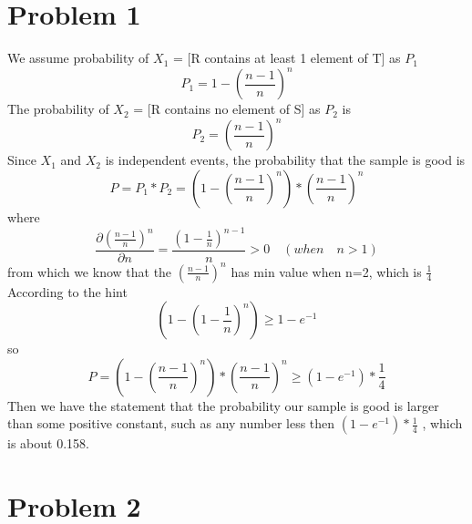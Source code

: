 \documentclass[twoside]{homework}
\begin{document}
\maketitle

\section*{Problem 1}
We assume probability of $X_1$ = [R contains at least 1 element of T] as $P_1$
$$P_1 = 1 - (\frac{n-1}{n})^n$$
The probability of $X_2$ = [R contains no element of S] as $P_2$ is
$$P_2 = (\frac{n-1}{n})^n$$
Since $X_1$ and $X_2$ is independent events, the probability that the sample is good is
$$P = P_1 * P_2=(1 - (\frac{n-1}{n})^n)*(\frac{n-1}{n})^n$$
where 
$$\frac{\partial (\frac{n-1}{n})^n}{\partial n} = \frac{(1-\frac{1}{n})^{n-1}}{n}>0 \quad (when\quad n>1)$$
from which we know that the $(\frac{n-1}{n})^n$ has min value when n=2, which is $\frac{1}{4}$\\
According to the hint $$(1 - (1-\frac{1}{n})^n) \ge 1-e^{-1}$$
so $$P=(1 - (\frac{n-1}{n})^n)*(\frac{n-1}{n})^n \ge (1-e^{-1})*\frac{1}{4}$$
Then we have the statement that the probability our sample is good is larger than some positive constant, such as any number less then $(1-e^{-1})*\frac{1}{4}$ , which is about 0.158.
\section*{Problem 2}
\end{document}
